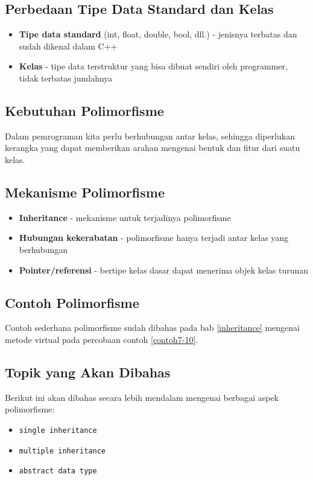 \subsection{Perbedaan Tipe Data Standard dan Kelas}

\begin{itemize}
\item \textbf{Tipe data standard} (int, float, double, bool, dll.) - jenisnya terbatas dan sudah dikenal dalam C++
\item \textbf{Kelas} - tipe data terstruktur yang bisa dibuat sendiri oleh programmer, tidak terbatas jumlahnya
\end{itemize}

\subsection{Kebutuhan Polimorfisme}

Dalam pemrograman kita perlu berhubungan antar kelas, sehingga diperlukan kerangka yang dapat memberikan arahan mengenai bentuk dan fitur dari suatu kelas.

\subsection{Mekanisme Polimorfisme}

\begin{itemize}
\item \textbf{Inheritance} - mekanisme untuk terjadinya polimorfisme
\item \textbf{Hubungan kekerabatan} - polimorfisme hanya terjadi antar kelas yang berhubungan
\item \textbf{Pointer/referensi} - bertipe kelas dasar dapat menerima objek kelas turunan
\end{itemize}

\subsection{Contoh Polimorfisme}

Contoh sederhana polimorfisme sudah dibahas pada bab \ref{inheritance} mengenai metode virtual pada percobaan contoh \ref{contoh7-10}.

\subsection{Topik yang Akan Dibahas}

Berikut ini akan dibahas secara lebih mendalam mengenai berbagai aspek polimorfisme:
\begin{itemize}
\item \texttt{single inheritance}
\item \texttt{multiple inheritance}
\item \texttt{abstract data type}
\end{itemize}


